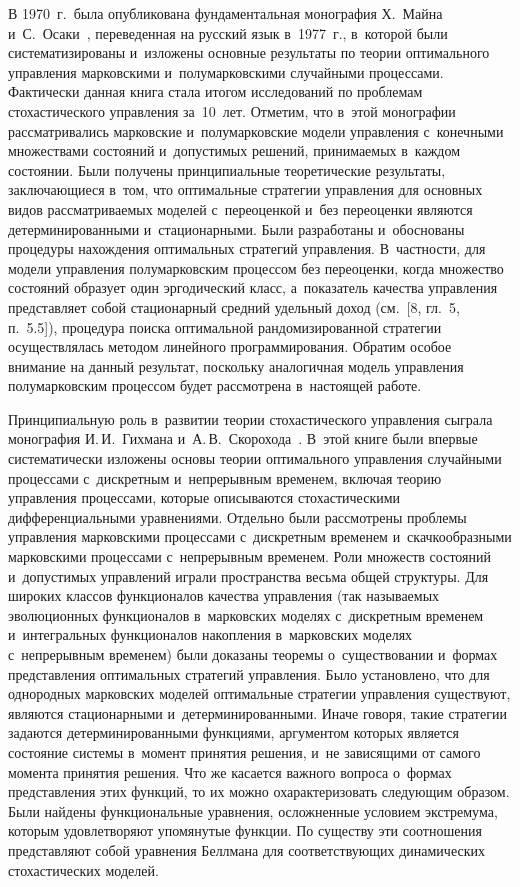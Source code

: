 \begin{multicols}{2}
В 1970~г.\ была опубликована фундаментальная монография Х.~Майна и~С.~Осаки~\cite{8}, 
переведенная на русский язык в~1977~г., в~которой были систе\-ма\-ти\-зи\-ро\-ва\-ны и~изложены 
основные результаты по теории оптимального управления марковскими и~полумарковскими 
случайными процессами. Фактически данная книга стала итогом исследований по проблемам 
стохастического управления\linebreak
 за~10~лет. Отметим, что в~этой монографии рас\-смат\-ри\-ва\-лись 
марковские и~полумарковские модели управления с~конечными множествами состояний 
и~допустимых решений, принимаемых \mbox{в~каждом} состоянии. Были получены принципиальные 
тео\-ре\-ти\-че\-ские результаты, заключающиеся в~том, что оптимальные стратегии управ\-ле\-ния 
для основных видов рас\-смат\-ри\-ва\-емых моделей с~переоценкой и~без переоценки являются 
детерминированными и~стационарными. Были разработаны и~обоснованы процедуры нахождения 
оптимальных стратегий управления. В~частности, для модели управления полумарковским 
процессом без переоценки, когда множество со\-сто\-яний образует один эргодический класс, 
а~показатель качества управления пред\-став\-ля\-ет собой стационарный средний удельный 
доход (см.~[8, гл.~5, п.~5.5]), процедура поиска оптимальной рандомизированной 
стратегии осуществлялась методом линейного программирования. Обратим особое внимание 
на данный результат, поскольку аналогичная модель управления полумарковским 
процессом будет рассмотрена в~настоящей работе.

Принципиальную роль в~развитии теории стохастического управления сыграла 
монография И.\,И.~Гихмана и~А.\,В.~Скорохода~\cite{9}. В~этой книге были впервые 
систематически изложены основы теории оптимального управления случайными процессами 
с~дискретным и~непрерывным временем, включая теорию управления процессами, которые 
описываются стохастическими дифференциальными уравнениями. Отдельно были рас\-смот\-ре\-ны 
проблемы управления марковскими процессами с~дискретным временем и~скачкообразными 
марковскими процессами с~непрерывным временем. Роли множеств состояний и~допустимых 
управ\-ле\-ний играли пространства весьма общей структуры. Для широких классов функционалов 
качества управ\-ле\-ния (так называемых эволюционных функционалов в~марковских моделях 
с~дискретным временем и~интегральных функционалов накопления в~марковских моделях 
с~непрерывным временем) были доказаны теоремы о~существовании и~формах пред\-став\-ле\-ния 
оптимальных стратегий управ\-ле\-ния. Было установлено, что для однородных марковских 
моделей оптимальные стратегии управ\-ле\-ния существуют, являются стационарными 
и~детерминированными. Иначе говоря, такие стратегии задаются детерминированными 
функциями, аргументом которых является со\-сто\-яние сис\-те\-мы в~момент принятия решения, 
и~не зависящими от самого момента принятия решения. Что же касается важного вопроса 
о~формах представления этих функций, то их можно охарактеризовать следующим образом. 
Были найдены функциональные уравнения, осложненные условием экстремума, которым 
удовле\-тво\-ря\-ют упомянутые функции. По существу эти соотношения пред\-став\-ля\-ют собой 
уравнения Беллмана для соответствующих динамических стохастических моделей.


\end{multicols}
